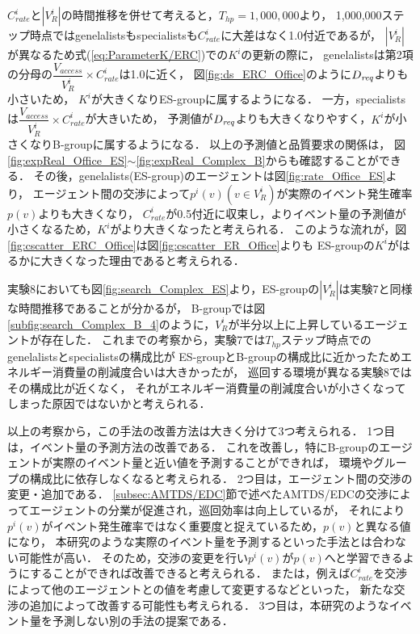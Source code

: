 \documentclass[12pt,a4j,twoside]{jarticle}
\def\Dreq{{D_{\it req}}}
\begin{document}
  $C^i_{rate}$と$|V^i_R|$の時間推移を併せて考えると，$T_{hp}=1,000,000$より，
  1,000,000ステップ時点ではgenelalistsもspecialistsも$C^i_{rate}$に大差はなく1.0付近であるが，
  $|V^i_R|$が異なるため式(\ref{eq:ParameterK/ERC})での$K^i$の更新の際に，
  genelalistsは第2項の分母の$\dfrac{V_{access}}{V^i_R} \times C^i_{rate}$は1.0に近く，
  図\ref{fig:ds_ERC_Office}のように$\Dreq$よりも小さいため，
  $K^i$が大きくなりES-groupに属するようになる．
  一方，specialistsは$\dfrac{V_{access}}{V^i_R} \times C^i_{rate}$が大きいため，
  予測値が$\Dreq$よりも大きくなりやすく，$K^i$が小さくなりB-groupに属するようになる．
  以上の予測値と品質要求の関係は，
  図\ref{fig:expReal_Office_ES}$\sim$\ref{fig:expReal_Complex_B}からも確認することができる．
  その後，genelalists(ES-group)のエージェントは図\ref{fig:rate_Office_ES}より，
  エージェント間の交渉によって$p^i(v) (v \in V^i_R)$が実際のイベント発生確率$p(v)$よりも大きくなり，
  $C^i_{rate}$が0.5付近に収束し，よりイベント量の予測値が小さくなるため，$K^i$がより大きくなったと考えられる．
  このような流れが，図\ref{fig:cscatter_ERC_Office}は図\ref{fig:cscatter_ER_Office}よりも
  ES-groupの$K^i$がはるかに大きくなった理由であると考えられる．
  \par

  実験8においても図\ref{fig:search_Complex_ES}より，ES-groupの$|V^i_R|$は実験7と同様な時間推移であることが分かるが，
  B-groupでは図\ref{subfig:search_Complex_B_4}のように，$V^i_R$が半分以上に上昇しているエージェントが存在した．
  これまでの考察から，実験7では$T_{hp}$ステップ時点でのgenelalistsとspecialistsの構成比が
  ES-groupとB-groupの構成比に近かったためエネルギー消費量の削減度合いは大きかったが，
  巡回する環境が異なる実験8ではその構成比が近くなく，
  それがエネルギー消費量の削減度合いが小さくなってしまった原因ではないかと考えられる．
  \par

  以上の考察から，この手法の改善方法は大きく分けて3つ考えられる．
  1つ目は，イベント量の予測方法の改善である．
  これを改善し，特にB-groupのエージェントが実際のイベント量と近い値を予測することができれば，
  環境やグループの構成比に依存しなくなると考えられる．
  2つ目は，エージェント間の交渉の変更・追加である．
  \ref{subsec:AMTDS/EDC}節で述べたAMTDS/EDCの交渉によってエージェントの分業が促進され，巡回効率は向上しているが，
  それにより$p^i(v)$がイベント発生確率ではなく重要度と捉えているため，$p(v)$と異なる値になり，
  本研究のような実際のイベント量を予測するといった手法とは合わない可能性が高い．
  そのため，交渉の変更を行い$p^i(v)$が$p(v)$へと学習できるようにすることができれば改善できると考えられる．
  または，例えば$C^i_{rate}$を交渉によって他のエージェントとの値を考慮して変更するなどといった，
  新たな交渉の追加によって改善する可能性も考えられる．
  3つ目は，本研究のようなイベント量を予測しない別の手法の提案である．
\end{document}
